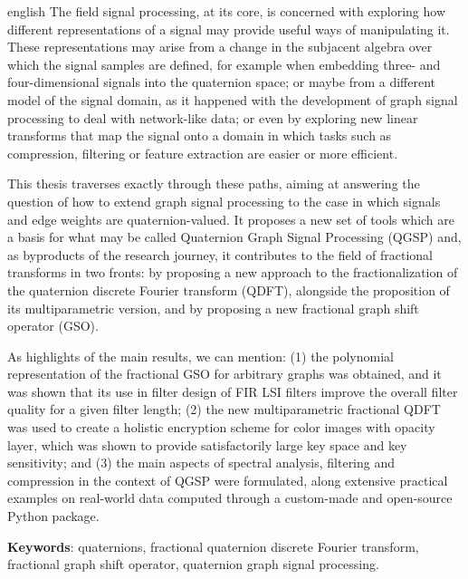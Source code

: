 \documentclass[
	11pt,				%
	openright,			%
	twoside,			%
	a4paper,			%
	french,				%
	brazil,			%
	english				%
	]{abntex2}
\begin{document}
%
\begin{resumo}[Abstract]
    \begin{otherlanguage*}{english}
        The field signal processing, at its core, is concerned with exploring how different representations of a signal may provide useful ways of manipulating it. These representations may arise from a change in the subjacent algebra over which the signal samples are defined, for example when embedding three- and four-dimensional signals into the quaternion space; or maybe from a different model of the signal domain, as it happened with the development of graph signal processing to deal with network-like data; or even by exploring new linear transforms that map the signal onto a domain in which tasks such as compression, filtering or feature extraction are easier or more efficient.

        This thesis traverses exactly through these paths, aiming at answering the question of how to extend graph signal processing to the case in which signals and edge weights are quaternion-valued. It proposes a new set of tools which are a basis for what may be called Quaternion Graph Signal Processing (QGSP) and, as byproducts of the research journey, it contributes to the field of fractional transforms in two fronts: by proposing a new approach to the fractionalization of the quaternion discrete Fourier transform (QDFT), alongside the proposition of its multiparametric version, and by proposing a new fractional graph shift operator (GSO).

        As highlights of the main results, we can mention: (1) the polynomial representation of the fractional GSO for arbitrary graphs was obtained, and it was shown that its use in filter design of FIR LSI filters improve the overall filter quality for a given filter length; (2) the new multiparametric fractional QDFT was used to create a holistic encryption scheme for color images with opacity layer, which was shown to provide satisfactorily large key space and key sensitivity; and (3) the main aspects of spectral analysis, filtering and compression in the context of QGSP were formulated, along extensive practical examples on real-world data computed through a custom-made and open-source Python package.
        \vspace{\onelineskip}

        \noindent
        \textbf{Keywords}: quaternions, fractional quaternion discrete Fourier transform, fractional graph shift operator, quaternion graph signal processing.
    \end{otherlanguage*}
\end{resumo}
\end{document}
